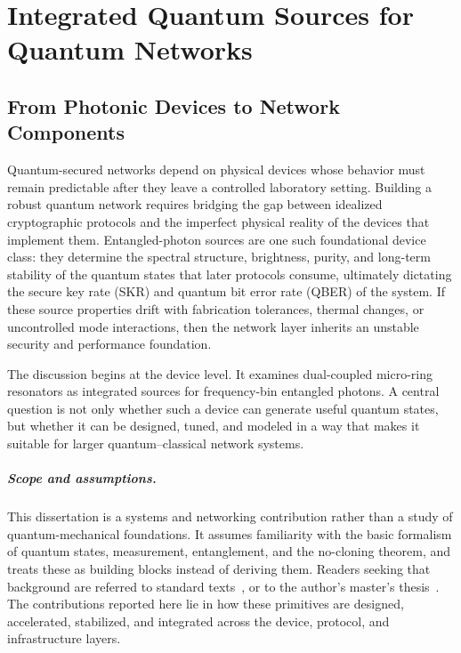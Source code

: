 \chapter{Integrated Quantum Sources for Quantum Networks}
\label{ch:quantum-sources}

\section{From Photonic Devices to Network Components}

Quantum-secured networks depend on physical devices whose behavior must remain predictable after they leave a controlled laboratory setting. Building a robust quantum network requires bridging the gap between idealized cryptographic protocols and the imperfect physical reality of the devices that implement them. Entangled-photon sources are one such foundational device class: they determine the spectral structure, brightness, purity, and long-term stability of the quantum states that later protocols consume, ultimately dictating the secure key rate (SKR) and quantum bit error rate (QBER) of the system. If these source properties drift with fabrication tolerances, thermal changes, or uncontrolled mode interactions, then the network layer inherits an unstable security and performance foundation.

The discussion begins at the device level. It examines dual-coupled micro-ring resonators as integrated sources for frequency-bin entangled photons. A central question is not only whether such a device can generate useful quantum states, but whether it can be designed, tuned, and modeled in a way that makes it suitable for larger quantum--classical network systems.

\paragraph{Scope and assumptions.} This dissertation is a systems and networking contribution rather than a study of quantum-mechanical foundations. It assumes familiarity with the basic formalism of quantum states, measurement, entanglement, and the no-cloning theorem, and treats these as building blocks instead of deriving them. Readers seeking that background are referred to standard texts~\cite{nielsen2010quantum}, or to the author's master's thesis~\cite{meyer2024master}. The contributions reported here lie in how these primitives are designed, accelerated, stabilized, and integrated across the device, protocol, and infrastructure layers.

